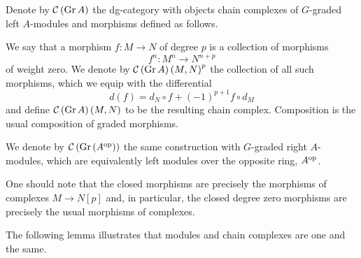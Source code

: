 \begin{definition}
  Denote by \(\mathcal{C}\left(\operatorname{Gr}A\right)\) the dg-category with objects chain complexes of \(G\)-graded left \(A\)-modules and morphisms defined as follows.
  
  We say that a morphism \(f \colon M \to N\) of degree \(p\) is a collection of morphisms
  \[f^n \colon M^n \to N^{n+p}\]
  of weight zero.
  We denote by \(\mathcal{C}\left(\operatorname{Gr}A\right)\left(M,N\right)^p\) the collection of all such morphisms, which we equip with the differential
  \[d(f) = d_N \circ f + (-1)^{p+1}f \circ d_M\]
  and define \(\mathcal{C}\left(\operatorname{Gr}A\right)(M,N)\) to be the resulting chain complex.
  Composition is the usual composition of graded morphisms.

  We denote by \(\mathcal{C}\left(\operatorname{Gr}\left(A^{{\operatorname{op}}}\right)\right)\) the same construction with \(G\)-graded right \(A\)-modules, which are equivalently left modules over the opposite ring, \(A^{\operatorname{op}}\).
\end{definition}

\begin{remark}
  One should note that the closed morphisms are precisely the morphisms of complexes \(M \to N[p]\) and, in particular, the closed degree zero morphisms are precisely the usual morphisms of complexes.
\end{remark}

The following lemma illustrates that modules and chain complexes are one and the same.

